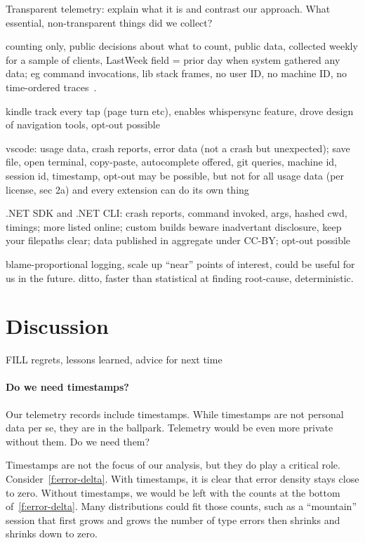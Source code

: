 \documentclass[english,submission,cleveref]{programming}
\begin{document}
Transparent telemetry: explain what it is and contrast our approach.
What essential, non-transparent things did we collect?

counting only, public decisions about what to count, public data,
collected weekly for a sample of clients, LastWeek field = prior day when
system gathered any data;
eg command invocations, lib stack frames, 
no user ID, no machine ID,
no time-ordered traces~\cite{transparent-telemetry}.

kindle track every tap (page turn etc),
enables whispersync feature,
drove design of navigation tools,
opt-out possible~\cite{kindle-telemetry}

vscode: usage data, crash reports, error data (not a crash but unexpected);
save file, open terminal, copy-paste, autocomplete offered, git queries, machine id,
session id, timestamp,
opt-out may be possible, but not for all usage data (per license, sec 2a) and
every extension can do its own thing~\cite{vscode-telemetry}

.NET SDK and .NET CLI:
crash reports, command invoked, args, hashed cwd, timings;
more listed online;
custom builds beware inadvertant disclosure, keep your filepaths clear;
data published in aggregate under CC-BY;
opt-out possible~\cite{dotnet-telemetry}


\cite{lnsmc-usenix-2018} blame-proportional logging,
scale up ``near'' points of interest,
could be useful for us in the future.
\cite{fnm-sigmod-2020} ditto, faster than statistical at finding root-cause,
deterministic.



\section{Discussion}
\label{s:conclusion}
\label{s:discussion}

FILL regrets, lessons learned, advice for next time

\paragraph{Do we need timestamps?}

Our telemetry records include timestamps.
While timestamps are not personal data per se, they are in the ballpark.
Telemetry would be even more private without them.
Do we need them?

Timestamps are not the focus of our analysis, but they do play a critical role.
Consider~\cref{f:error-delta}.
With timestamps, it is clear that error density stays close to zero.
Without timestamps, we would be left with the counts at the bottom
of~\cref{f:error-delta}.
Many distributions could fit those counts, such as a ``mountain'' session that first
grows and grows the number of type errors then shrinks and shrinks down to zero.
\end{document}
